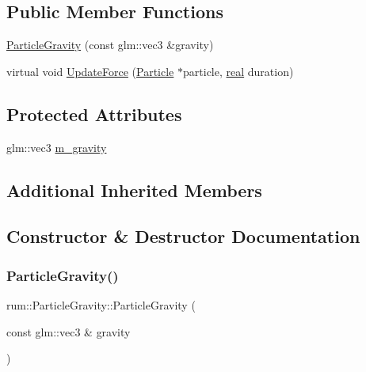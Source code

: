 \subsection*{Public Member Functions}
\begin{DoxyCompactItemize}
\item 
\hyperlink{classrum_1_1_particle_gravity_af489016667073103233d0703ab2efbaa}{Particle\+Gravity} (const glm\+::vec3 \&gravity)
\item 
virtual void \hyperlink{classrum_1_1_particle_gravity_a8b943480e3856d1818e5090097403679}{Update\+Force} (\hyperlink{classrum_1_1_particle}{Particle} $\ast$particle, \hyperlink{namespacerum_a7e8cca23573d5eaead0f138cbaa4862c}{real} duration)
\end{DoxyCompactItemize}
\subsection*{Protected Attributes}
\begin{DoxyCompactItemize}
\item 
glm\+::vec3 \hyperlink{classrum_1_1_particle_gravity_a9fbc86ccd5d18e93626a6c4b0fc3b5e2}{m\+\_\+gravity}
\end{DoxyCompactItemize}
\subsection*{Additional Inherited Members}


\subsection{Constructor \& Destructor Documentation}
\mbox{\label{classrum_1_1_particle_gravity_af489016667073103233d0703ab2efbaa}} 
\subsubsection{\texorpdfstring{Particle\+Gravity()}{ParticleGravity()}}
{\footnotesize\ttfamily rum\+::\+Particle\+Gravity\+::\+Particle\+Gravity (\begin{DoxyParamCaption}\item[{const glm\+::vec3 \&}]{gravity }\end{DoxyParamCaption})}



